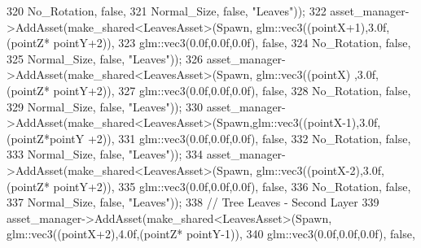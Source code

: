 \begin{DoxyCode}
320                                                              No\_Rotation, \textcolor{keyword}{false},
321                                                              Normal\_Size, \textcolor{keyword}{false}, \textcolor{stringliteral}{"Leaves"}));
322             asset\_manager->AddAsset(make\_shared<LeavesAsset>(Spawn, glm::vec3((pointX+1),3.0f,(pointZ*
      pointY+2)),
323                                                              glm::vec3(0.0f,0.0f,0.0f), \textcolor{keyword}{false},
324                                                              No\_Rotation, \textcolor{keyword}{false},
325                                                              Normal\_Size, \textcolor{keyword}{false}, \textcolor{stringliteral}{"Leaves"}));
326             asset\_manager->AddAsset(make\_shared<LeavesAsset>(Spawn, glm::vec3((pointX)  ,3.0f,(pointZ*
      pointY+2)),
327                                                              glm::vec3(0.0f,0.0f,0.0f), \textcolor{keyword}{false},
328                                                              No\_Rotation, \textcolor{keyword}{false},
329                                                              Normal\_Size, \textcolor{keyword}{false}, \textcolor{stringliteral}{"Leaves"}));
330             asset\_manager->AddAsset(make\_shared<LeavesAsset>(Spawn,glm::vec3((pointX-1),3.0f,(pointZ*pointY
      +2)),                                                       
331                                                              glm::vec3(0.0f,0.0f,0.0f), \textcolor{keyword}{false},
332                                                              No\_Rotation, \textcolor{keyword}{false},
333                                                              Normal\_Size, \textcolor{keyword}{false}, \textcolor{stringliteral}{"Leaves"}));
334             asset\_manager->AddAsset(make\_shared<LeavesAsset>(Spawn, glm::vec3((pointX-2),3.0f,(pointZ*
      pointY+2)),
335                                                              glm::vec3(0.0f,0.0f,0.0f), \textcolor{keyword}{false},
336                                                              No\_Rotation, \textcolor{keyword}{false},
337                                                              Normal\_Size, \textcolor{keyword}{false}, \textcolor{stringliteral}{"Leaves"}));
338             \textcolor{comment}{// Tree Leaves - Second Layer}
339             asset\_manager->AddAsset(make\_shared<LeavesAsset>(Spawn, glm::vec3((pointX+2),4.0f,(pointZ*
      pointY-1)),
340                                                              glm::vec3(0.0f,0.0f,0.0f), \textcolor{keyword}{false},

\end{DoxyCode}
